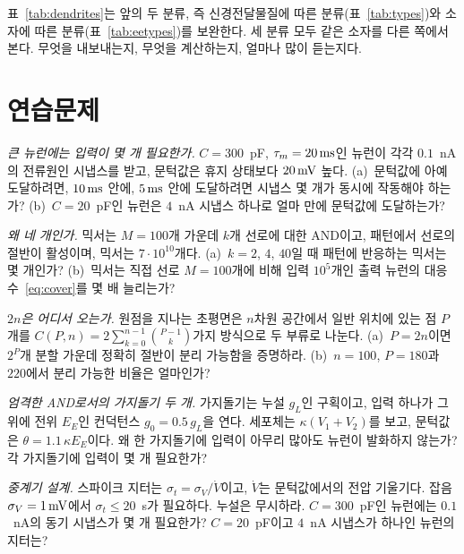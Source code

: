 표~\ref{tab:dendrites}는 앞의 두 분류, 즉 신경전달물질에 따른 분류(표~\ref{tab:types})와 소자에 따른 분류(표~\ref{tab:eetypes})를 보완한다. 세 분류 모두 같은 소자를 다른 쪽에서 본다. 무엇을 내보내는지, 무엇을 계산하는지, 얼마나 많이 듣는지다.

\section{연습문제}

\begin{exercise}[\lvlA]
\label{ex:19:1}
\emph{큰 뉴런에는 입력이 몇 개 필요한가.} $C=300$~pF, $\tau_m=20\,\text{ms}$인 뉴런이 각각 $0.1$~nA의 전류원인 시냅스를 받고, 문턱값은 휴지 상태보다 $20\,\text{mV}$ 높다. (a)~문턱값에 아예 도달하려면, $10\,\text{ms}$ 안에, $5\,\text{ms}$ 안에 도달하려면 시냅스 몇 개가 동시에 작동해야 하는가? (b)~$C=20$~pF인 뉴런은 $4$~nA 시냅스 하나로 얼마 만에 문턱값에 도달하는가?
\end{exercise}

\begin{exercise}[\lvlA]
\label{ex:19:2}
\emph{왜 네 개인가.} 믹서는 $M=100$개 가운데 $k$개 선로에 대한 AND이고, 패턴에서 선로의 절반이 활성이며, 믹서는 $7\cdot10^{10}$개다. (a)~$k=2$, $4$, $40$일 때 패턴에 반응하는 믹서는 몇 개인가? (b)~믹서는 직접 선로 $M=100$개에 비해 입력 $10^5$개인 출력 뉴런의 대응 수~\eqref{eq:cover}를 몇 배 늘리는가?
\end{exercise}

\begin{exercise}[\lvlB]
\label{ex:19:3}
\emph{$2n$은 어디서 오는가.} 원점을 지나는 초평면은 $n$차원 공간에서 일반 위치에 있는 점 $P$개를 $C(P,n)=2\sum_{k=0}^{n-1}\binom{P-1}{k}$가지 방식으로 두 부류로 나눈다. (a)~$P=2n$이면 $2^P$개 분할 가운데 정확히 절반이 분리 가능함을 증명하라. (b)~$n=100$, $P=180$과 $220$에서 분리 가능한 비율은 얼마인가?
\end{exercise}

\begin{exercise}[\lvlB]
\label{ex:19:4}
\emph{엄격한 AND로서의 가지돌기 두 개.} 가지돌기는 누설 $g_L$인 구획이고, 입력 하나가 그 위에 전위 $E_E$인 컨덕턴스 $g_0=0.5\,g_L$을 연다. 세포체는 $\kappa(V_1+V_2)$를 보고, 문턱값은 $\theta=1.1\,\kappa E_E$이다. 왜 한 가지돌기에 입력이 아무리 많아도 뉴런이 발화하지 않는가? 각 가지돌기에 입력이 몇 개 필요한가?
\end{exercise}

\begin{exercise}[\lvlB]
\label{ex:19:5}
\emph{중계기 설계.} 스파이크 지터는 $\sigma_t=\sigma_V/\dot V$이고, $\dot V$는 문턱값에서의 전압 기울기다. 잡음 $\sigma_V=1\,\text{mV}$에서 $\sigma_t\le20$~\textmu s가 필요하다. 누설은 무시하라. $C=300$~pF인 뉴런에는 $0.1$~nA의 동기 시냅스가 몇 개 필요한가? $C=20$~pF이고 $4$~nA 시냅스가 하나인 뉴런의 지터는?
\end{exercise}

